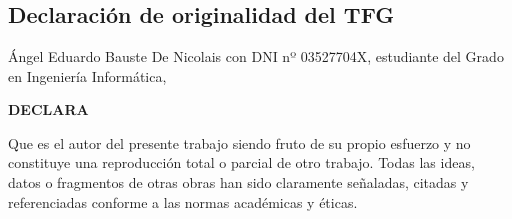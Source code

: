 \chapter*{}

\section*{Declaración de originalidad del TFG}

\noindent Ángel Eduardo Bauste De Nicolais con DNI nº 03527704X, estudiante del Grado en Ingeniería Informática,

\noindent\textbf{DECLARA}

Que es el autor del presente trabajo siendo fruto de su propio esfuerzo y no constituye una reproducción total o parcial de otro trabajo. Todas las ideas, datos o fragmentos de otras obras han sido claramente señaladas, citadas y referenciadas conforme a las normas académicas y éticas.

